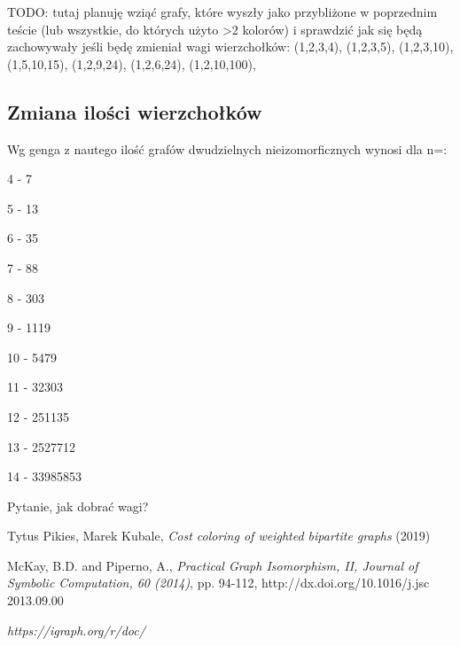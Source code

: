 \documentclass{article}
\begin{document}
TODO: tutaj planuję wziąć grafy, które wyszły jako przybliżone w poprzednim teście (lub wszystkie, do których użyto >2 kolorów) i sprawdzić jak się będą zachowywały jeśli będę zmieniał wagi wierzchołków: (1,2,3,4), (1,2,3,5), (1,2,3,10), (1,5,10,15), (1,2,9,24), (1,2,6,24), (1,2,10,100), 

\subsection{Zmiana ilości wierzchołków}

Wg genga z nautego ilość grafów dwudzielnych nieizomorficznych wynosi dla n=:

4  - 7

5  - 13

6  - 35

7  - 88

8  - 303

9  - 1119

10 - 5479

11 - 32303

12 - 251135

13 - 2527712

14 - 33985853

Pytanie, jak dobrać wagi?

\begin{thebibliography}{9}

Tytus Pikies, Marek Kubale,
\emph{Cost coloring of weighted bipartite graphs}
(2019)

McKay, B.D. and Piperno, A., 
\emph{Practical Graph Isomorphism, II, Journal of Symbolic Computation, 60 (2014)}, 
pp. 94-112, http://dx.doi.org/10.1016/j.jsc 2013.09.00

\emph{https://igraph.org/r/doc/}

\end{thebibliography}
\end{document}
